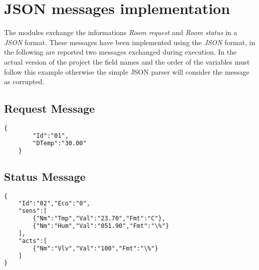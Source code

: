 \section{JSON messages implementation}
The modules exchange the informations \textit{Room request} and \textit{Room status} in a \textit{JSON} format.
These messages have been implemented using the \textit{JSON} format, in the following are reported two messages exchanged during execution.
In the actual version of the project the field names and the order of the variables must follow this example otherwise the simple JSON parser will consider the message as corrupted.

\subsection{Request Message}
\lstset{style=custompython}
\begin{lstlisting}[language=XML]
	{
		"Id":"01",
		"DTemp":"30.00"
	}
\end{lstlisting}

\subsection{Status Message}
\lstset{style=custompython}
\begin{lstlisting}[language=XML]
{
	"Id":"02","Eco":"0",
	"sens":[
		{"Nm":"Tmp","Val":"23.70","Fmt":"C"},
		{"Nm":"Hum","Val":"051.90","Fmt":"\%"}
	],
	"acts":[
		{"Nm":"Vlv","Val":"100","Fmt":"\%"}
	]
}
\end{lstlisting}